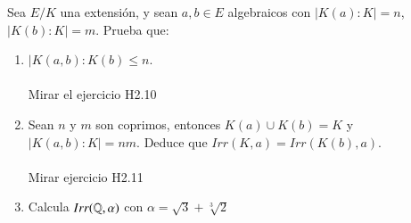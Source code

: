 \begin{ex}[H2.12]
    Sea $E/K$ una extensión, y sean $a, b \in E$ algebraicos con $|K(a):K| = n$, $|K(b):K| = m$. Prueba que:

    \begin{enumerate}
        \item $|K(a, b) : K(b) \leq n$.\\\\
        Mirar el ejercicio H2.10

        \item Sean $n$ y $m$ son coprimos, entonces $K(a)\cup K(b) = K$ y $|K(a, b):K|=nm$. Deduce que $Irr(K, a) = Irr(K(b), a)$.\\\\
        Mirar ejercicio H2.11\\
        \item Calcula $Irr(\mathbb{Q}, \alpha)$ con $\alpha = \sqrt{3} + \sqrt[3]{2}$
    \end{enumerate}
\end{ex}
